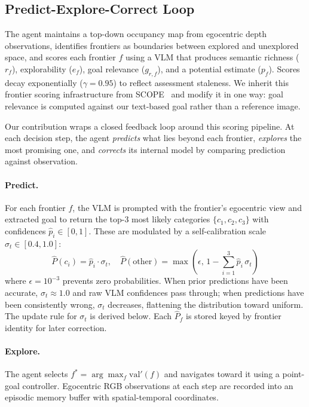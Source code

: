 \subsection{Predict-Explore-Correct Loop}
\label{sec:pec}

The agent maintains a top-down occupancy map from egocentric depth observations, identifies frontiers as boundaries between explored and unexplored space, and scores each frontier $f$ using a VLM that produces semantic richness ($r_f$), explorability ($e_f$), goal relevance ($g_{r,f}$), and a potential estimate ($p_f$). Scores decay exponentially ($\gamma = 0.95$) to reflect assessment staleness. We inherit this frontier scoring infrastructure from SCOPE~\cite{wang2026scope} and modify it in one way: goal relevance is computed against our text-based goal rather than a reference image.

Our contribution wraps a closed feedback loop around this scoring pipeline. At each decision step, the agent \emph{predicts} what lies beyond each frontier, \emph{explores} the most promising one, and \emph{corrects} its internal model by comparing prediction against observation.

\paragraph{Predict.} For each frontier $f$, the VLM is prompted with the frontier's egocentric view and extracted goal to return the top-3 most likely categories $\{c_1, c_2, c_3\}$ with confidences $\hat{p}_i \in [0,1]$. These are modulated by a self-calibration scale $\sigma_t \in [0.4, 1.0]$:
\begin{equation}
    \hat{P}(c_i) = \hat{p}_i \cdot \sigma_t, \quad
    \hat{P}(\text{other}) = \max\!\left(\epsilon,\, 1 - \textstyle\sum_{i=1}^{3} \hat{p}_i \, \sigma_t\right)
    \label{eq:predict}
\end{equation}
where $\epsilon = 10^{-3}$ prevents zero probabilities. When prior predictions have been accurate, $\sigma_t \approx 1.0$ and raw VLM confidences pass through; when predictions have been consistently wrong, $\sigma_t$ decreases, flattening the distribution toward uniform. The update rule for $\sigma_t$ is derived below. Each $\hat{P}_f$ is stored keyed by frontier identity for later correction.

\paragraph{Explore.} The agent selects $f^* = \arg\max_f \mathrm{val}'(f)$ and navigates toward it using a point-goal controller. Egocentric RGB observations at each step are recorded into an episodic memory buffer with spatial-temporal coordinates.

